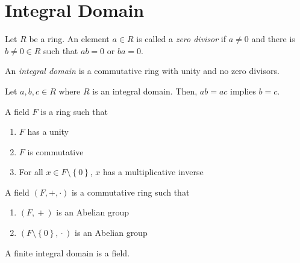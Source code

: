 \chapter{Integral Domain}

\begin{definition}
    Let \(R\) be a ring. An element \(a \in R\) is called a \textit{zero divisor} if \(a \neq 0\) and there is \(b \neq 0 \in R\) such that \(ab = 0\) or \(ba = 0\).
\end{definition}

\begin{definition}
    An \textit{integral domain} is a commutative ring with unity and no zero divisors.
\end{definition}

\begin{theorem}
    Let \(a, b, c \in R\) where \(R\) is an integral domain. Then, \(ab = ac\) implies \(b = c\).
\end{theorem}

\begin{definition}[Field]
    A field \(F\) is a ring such that
    \begin{enumerate}
        \item \(F\) has a unity
        \item \(F\) is commutative
        \item For all \(x \in F \setminus \left\{0\right\}\), \(x\) has a multiplicative inverse
    \end{enumerate}
\end{definition}

\begin{remark}
    A field \((F, +, \cdot)\) is a commutative ring such that
    \begin{enumerate}
        \item \((F, {}+{})\) is an Abelian group
        \item \((F \setminus \left\{0\right\}, {}\cdot{})\) is an Abelian group
    \end{enumerate}
\end{remark}

\begin{theorem}
    A finite integral domain is a field.
\end{theorem}
